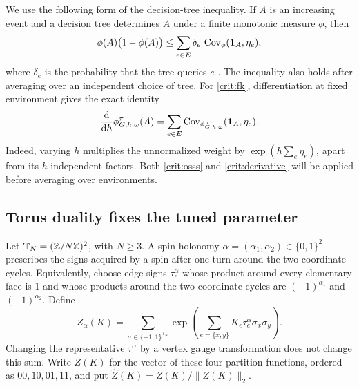 We use the following form of the decision-tree inequality. If $A$ is an
increasing event and a decision tree determines $A$ under a finite
monotonic measure $\phi$, then
\begin{equation}
 \phi(A)\bigl(1-\phi(A)\bigr)
 \le \sum_{e\in E}\delta_e\,
       \operatorname{Cov}_{\phi}(\mathbf 1_A,\eta_e),
 \label{crit:osss}
\end{equation}
where $\delta_e$ is the probability that the tree queries $e$
\cite[Theorem~1.1]{DCRT}. The inequality also holds after averaging over
an independent choice of tree. For \eqref{crit:fk}, differentiation at
fixed environment gives the exact identity
\begin{equation}
 \frac{\mathrm d}{\mathrm d h}\phi_{G,h,\omega}^{\pi}(A)
 =\sum_{e\in E}
       \operatorname{Cov}_{\phi_{G,h,\omega}^{\pi}}(\mathbf 1_A,\eta_e).
 \label{crit:derivative}
\end{equation}
Indeed, varying $h$ multiplies the unnormalized weight by
$\exp(h\sum_e\eta_e)$, apart from its $h$-independent factors. Both
\eqref{crit:osss} and \eqref{crit:derivative} will be applied before
averaging over environments.

\subsection{Torus duality fixes the tuned parameter}

Let $\mathbb T_N=(\mathbb Z/N\mathbb Z)^2$, with $N\ge3$. A spin holonomy
$\alpha=(\alpha_1,\alpha_2)\in\{0,1\}^2$ prescribes the signs acquired
by a spin after one turn around the two coordinate cycles. Equivalently,
choose edge signs $\tau_e^\alpha$ whose product around every elementary
face is $1$ and whose products around the two coordinate cycles are
$(-1)^{\alpha_1}$ and $(-1)^{\alpha_2}$. Define
\[
 Z_\alpha(K)=\sum_{\sigma\in\{-1,1\}^{\mathbb T_N}}
       \exp\left(\sum_{e=\{x,y\}}K_e\tau_e^\alpha\sigma_x\sigma_y\right).
\]
Changing the representative $\tau^\alpha$ by a vertex gauge
transformation does not change this sum. Write $Z(K)$ for the vector of
these four partition functions, ordered as $00,10,01,11$, and put
$\widehat Z(K)=Z(K)/\|Z(K)\|_2$.

